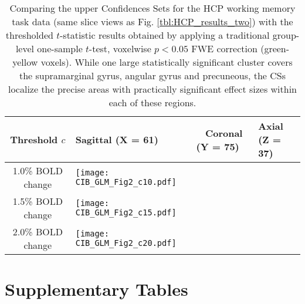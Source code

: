 \begin{table}[htbp]
\hspace*{-0.5cm}
\begin{adjustbox}{center}
\centering
    \begin{tabular}{cm{50mm}m{50mm}m{50mm}}
       \toprule
         Threshold $c$ & \hspace{1.4cm} Sagittal (X = 61) & \ \hspace{1.2cm} Coronal (Y = 75) & \hspace{1.0cm} Axial (Z = 37)\\
        \midrule
        1.0\% BOLD change & \texttt{[image: CIB\_GLM\_Fig2\_c10.pdf]}\\
        1.5\% BOLD change & \texttt{[image: CIB\_GLM\_Fig2\_c15.pdf]}\\
        2.0\% BOLD change & \texttt{[image: CIB\_GLM\_Fig2\_c20.pdf]}\\
        \bottomrule
    \end{tabular}
\end{adjustbox}
    \caption{Comparing the upper Confidences Sets for the HCP working memory task data (same slice views as Fig. \ref{tbl:HCP_results_two}) with the thresholded $t$-statistic results obtained by applying a traditional group-level one-sample $t$-test, voxelwise $p < 0.05$ FWE correction (green-yellow voxels). While one large statistically significant cluster covers the supramarginal gyrus, angular gyrus and precuneous, the CSs localize the precise areas with practically significant effect sizes within each of these regions.}
    \label{tbl:Supp_HCP_results_two}
\end{table}

\section{Supplementary Tables}
\label{sec:supp_CI_tabs}

